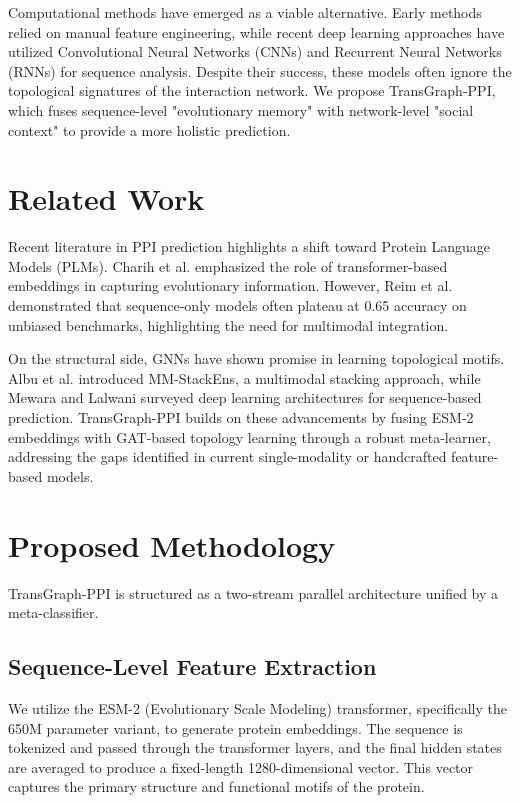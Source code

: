 \documentclass[conference]{IEEEtran}
\begin{document}
Computational methods have emerged as a viable alternative. Early methods relied on manual feature engineering, while recent deep learning approaches have utilized Convolutional Neural Networks (CNNs) and Recurrent Neural Networks (RNNs) for sequence analysis. Despite their success, these models often ignore the topological signatures of the interaction network. We propose TransGraph-PPI, which fuses sequence-level "evolutionary memory" with network-level "social context" to provide a more holistic prediction.

\section{Related Work}
Recent literature in PPI prediction highlights a shift toward Protein Language Models (PLMs). Charih et al. \cite{charih2025} emphasized the role of transformer-based embeddings in capturing evolutionary information. However, Reim et al. \cite{reim2025} demonstrated that sequence-only models often plateau at 0.65 accuracy on unbiased benchmarks, highlighting the need for multimodal integration.

On the structural side, GNNs have shown promise in learning topological motifs. Albu et al. \cite{albu2023} introduced MM-StackEns, a multimodal stacking approach, while Mewara and Lalwani \cite{mewara2022} surveyed deep learning architectures for sequence-based prediction. TransGraph-PPI builds on these advancements by fusing ESM-2 embeddings with GAT-based topology learning through a robust meta-learner, addressing the gaps identified in current single-modality or handcrafted feature-based models.

\section{Proposed Methodology}
TransGraph-PPI is structured as a two-stream parallel architecture unified by a meta-classifier.

\subsection{Sequence-Level Feature Extraction}
We utilize the ESM-2 (Evolutionary Scale Modeling) transformer, specifically the 650M parameter variant, to generate protein embeddings. The sequence is tokenized and passed through the transformer layers, and the final hidden states are averaged to produce a fixed-length 1280-dimensional vector. This vector captures the primary structure and functional motifs of the protein.
\end{document}
